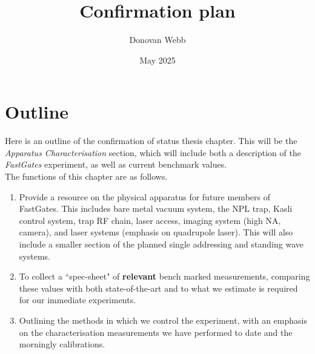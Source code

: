 \documentclass{report}
\title{Confirmation plan}
\author{Donovan Webb }
\date{May 2025}
\begin{document}
\maketitle

\section{Outline}
Here is an outline of the confirmation of status thesis chapter. This will be the \textit{Apparatus Characterisation} section, which will include both a description of the \textit{FastGates} experiment, as well as current benchmark values.\\

The functions of this chapter are as follows.
\begin{enumerate}
    \item Provide a resource on the physical apparatus for future members of FastGates. This includes bare metal vacuum system, the NPL trap, Kasli control system, trap RF chain, laser access, imaging system (high NA, camera), and laser systems (emphasis on quadrupole laser). This will also include a smaller section of the planned single addressing and standing wave systems.
    \item To collect a ``spec-sheet" of \textbf{relevant} bench marked measurements, comparing these values with both state-of-the-art and to what we estimate is required for our immediate experiments.
    \item Outlining the methods in which we control the experiment, with an emphasis on the characterisation measurements we have performed to date and the morningly calibrations.
\end{enumerate}
\end{document}
